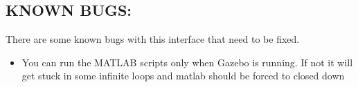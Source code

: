 \documentclass[letterpaper,10pt]{article}
\begin{document}
\subsection{KNOWN BUGS:}\label{known-bugs}

There are some known bugs with this interface that need to be fixed. 
\begin{itemize}
 \item You can run the MATLAB scripts only when Gazebo is running. If not it
will get stuck in some infinite loops and matlab should be forced to
closed down 
\end{itemize}
\end{document}
